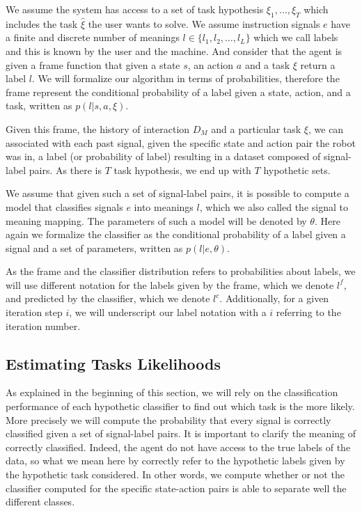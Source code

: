 We assume the system has access to a set of task hypothesis $\xi_1,\ldots,\xi_T$ which includes the task $\hat{\xi}$ the user wants to solve. We assume instruction signals $e$ have a finite and discrete number of meanings $l \in \{l_1, l_2, \ldots, l_L\}$ which we call labels and this is known by the user and the machine. And consider that the agent is given a frame function that given a state $s$, an action $a$ and a task $\xi$ return a label $l$. We will formalize our algorithm in terms of probabilities, therefore the frame represent the conditional probability of a label given a state, action, and a task, written as $p(l | s, a, \xi)$.

Given this frame, the history of interaction $D_M$ and a particular task $\xi$, we can associated with each past signal, given the specific state and action pair the robot was in, a label (or probability of label) resulting in a dataset composed of signal-label pairs. As there is $T$ task hypothesis, we end up with $T$ hypothetic sets. 

We assume that given such a set of signal-label pairs, it is possible to compute a model that classifies signals $e$ into meanings $l$, which we also called the signal to meaning mapping. The parameters of such a model will be denoted by $\theta$. Here again we formalize the classifier as the conditional probability of a label given a signal and a set of parameters, written as $p(l|e,\theta)$.

As the frame and the classifier distribution refers to probabilities about labels, we will use different notation for the labels given by the frame, which we denote $l^f$, and predicted by the classifier, which we denote $l^c$.  Additionally, for a given iteration step $i$, we will underscript our label notation with a $i$ referring to the iteration number.


\subsection{Estimating Tasks Likelihoods}


As explained in the beginning of this section, we will rely on the classification performance of each hypothetic classifier to find out which task is the more likely. More precisely we will compute the probability that every signal is correctly classified given a set of signal-label pairs. It is important to clarify the meaning of correctly classified. Indeed, the agent do not have access to the true labels of the data, so what we mean here by correctly refer to the hypothetic labels given by the hypothetic task considered. In other words, we compute whether or not the classifier computed for the specific state-action pairs is able to separate well the different classes. 

